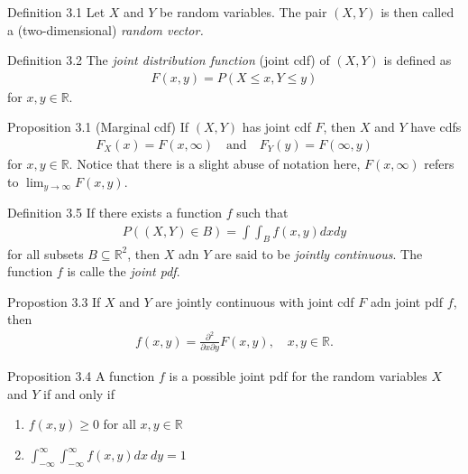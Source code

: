 \begin{boks}{Definition 3.1}
Let $X$ and $Y$ be random variables. The pair $(X,Y)$ is then called a (two-dimensional) \textit{random vector.}
\end{boks}

\begin{boks}{Definition 3.2}
The \textit{joint distribution function} (joint cdf) of $(X,Y)$ is defined as
\begin{align*}
    F(x,y) = P(X \leq x, Y \leq y)
\end{align*}
for $x,y \in \mathbb{R}$.
\end{boks}

\begin{boks}{Proposition 3.1 (Marginal cdf)}
If $(X, Y)$ has joint cdf $F$, then $X$ and $Y$ have cdfs
\begin{align*}
    F_X(x) = F(x, \infty) \quad \text{and} \quad F_Y(y) = F(\infty, y)
\end{align*}
for $x,y \in \mathbb{R}$. Notice that there is a slight abuse of notation here, $F(x,\infty)$ refers to $\lim_{y \rightarrow \infty} F(x, y)$.
\end{boks}

\begin{boks}{Definition 3.5}
If there exists a function $f$ such that
\begin{align*}
    P((X, Y)\in B) = \int\int_B f(x, y) dx dy
\end{align*}
for all subsets $B\subseteq \mathbb{R}^2$, then $X$ adn $Y$ are said to be \textit{jointly continuous}. The function $f$ is calle the \textit{joint pdf}.
\end{boks}

\begin{boks}{Propostion 3.3}
If $X$ and $Y$ are jointly continuous with joint cdf $F$ adn joint pdf $f$, then
\begin{align*}
    f(x, y) = \frac{\partial^2}{\partial x \partial y} F(x,y), \quad x,y \in \mathbb{R}.
\end{align*}
\end{boks}

\begin{boks}{Proposition 3.4}
A function $f$ is a possible joint pdf for the random variables $X$ and $Y$ if and only if
\begin{enumerate}
    \item $f(x, y) \geq 0$ for all $x,y \in \mathbb{R}$
    \item $\int_{-\infty}^\infty \int_{-\infty}^\infty f(x,y)dx\  dy = 1$
\end{enumerate}
\end{boks}

